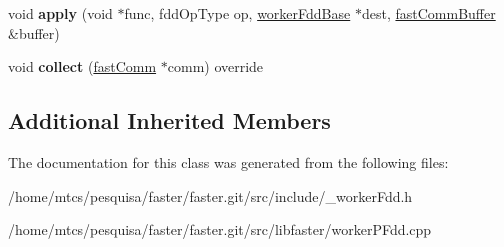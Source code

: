 \begin{DoxyCompactItemize}
\item 
\hypertarget{classfaster_1_1__workerFdd_3_01T_01_5_01_4_a249018ae1fe5990f9b081c8519fccf13}{}void {\bfseries apply} (void $\ast$func, fdd\+Op\+Type op, \hyperlink{classfaster_1_1workerFddBase}{worker\+Fdd\+Base} $\ast$dest, \hyperlink{classfaster_1_1fastCommBuffer}{fast\+Comm\+Buffer} \&buffer)\label{classfaster_1_1__workerFdd_3_01T_01_5_01_4_a249018ae1fe5990f9b081c8519fccf13}

\item 
\hypertarget{classfaster_1_1__workerFdd_3_01T_01_5_01_4_a3548e79c7a505468d842a6bb49e392f3}{}void {\bfseries collect} (\hyperlink{classfaster_1_1fastComm}{fast\+Comm} $\ast$comm) override\label{classfaster_1_1__workerFdd_3_01T_01_5_01_4_a3548e79c7a505468d842a6bb49e392f3}

\end{DoxyCompactItemize}
\subsection*{Additional Inherited Members}


The documentation for this class was generated from the following files\+:\begin{DoxyCompactItemize}
\item 
/home/mtcs/pesquisa/faster/faster.\+git/src/include/\+\_\+worker\+Fdd.\+h\item 
/home/mtcs/pesquisa/faster/faster.\+git/src/libfaster/worker\+P\+Fdd.\+cpp\end{DoxyCompactItemize}
